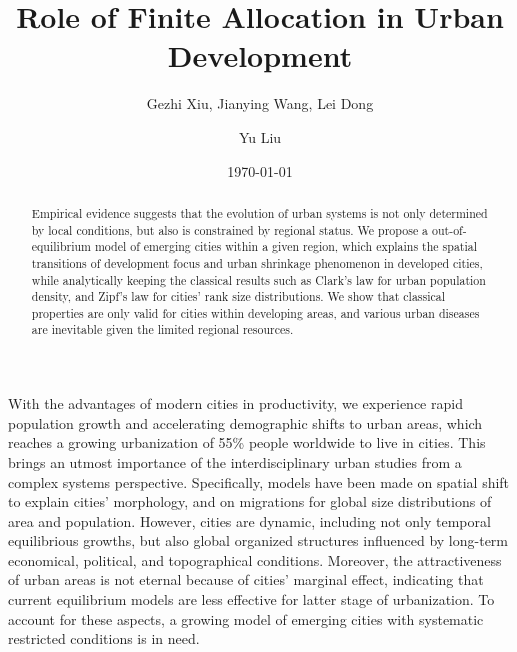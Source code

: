 \documentclass[reprint,unsortedaddress,amsmath,amssymb,aps,prl,showkeys]{revtex4-2}
\begin{document}
\title{Role of Finite Allocation in Urban Development}
\author{Gezhi Xiu, Jianying Wang, Lei Dong}
\author{Yu Liu}
\date{\today}

\begin{abstract}
	Empirical evidence suggests that the evolution of urban systems is not only determined by local conditions, but also is constrained by regional status. We propose a out-of-equilibrium model of emerging cities within a given region, which explains the spatial transitions of development focus and urban shrinkage phenomenon in developed cities, while analytically keeping the classical results such as Clark's law for urban population density, and Zipf's law for cities' rank size distributions. We show that classical properties are only valid for cities within developing areas, and various urban diseases are inevitable given the limited regional resources. 
\end{abstract}

\maketitle

With the advantages of modern cities in productivity, we experience rapid population growth and accelerating demographic shifts to urban areas, which reaches a growing urbanization of 55\% people worldwide to live in cities. This brings an utmost importance of the interdisciplinary urban studies from a complex systems perspective\cite{batty2007cities,portugali2011complexity,angel2005dynamics,boeing2017structure,bettencourt2013origins,batty2013new}. Specifically, models have been made on spatial shift to explain cities' morphology, and on migrations for global size distributions of area and population. However, cities are dynamic, including not only temporal equilibrious growths, but also global organized structures influenced by long-term economical, political, and topographical conditions. Moreover, the attractiveness of urban areas is not eternal because of cities' marginal effect\cite{girardin2009quantifying}, indicating that current equilibrium models are less effective for latter stage of urbanization. To account for these aspects, a growing model of emerging cities with systematic restricted conditions is in need.
\end{document}
